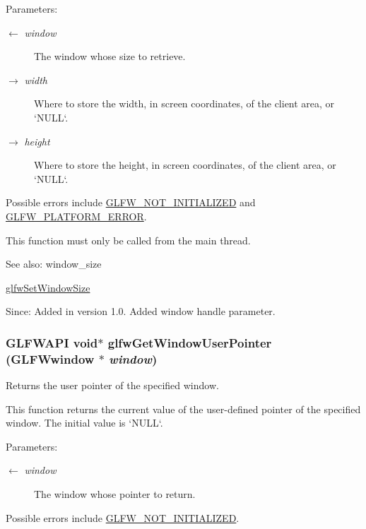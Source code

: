 \begin{Desc}
\item[Parameters:]
\begin{description}
\item[\mbox{$\leftarrow$} {\em window}]The window whose size to retrieve. \item[\mbox{$\rightarrow$} {\em width}]Where to store the width, in screen coordinates, of the client area, or `NULL`. \item[\mbox{$\rightarrow$} {\em height}]Where to store the height, in screen coordinates, of the client area, or `NULL`.\end{description}
\end{Desc}
Possible errors include \hyperlink{group__errors_g2374ee02c177f12e1fa76ff3ed15e14a}{GLFW\_\-NOT\_\-INITIALIZED} and \hyperlink{group__errors_gd44162d78100ea5e87cdd38426b8c7a1}{GLFW\_\-PLATFORM\_\-ERROR}.

This function must only be called from the main thread.

\begin{Desc}
\item[See also:]window\_\-size 

\hyperlink{group__window_ge54d1f4915ded15e267ddd3f41496cd2}{glfwSetWindowSize}\end{Desc}
\begin{Desc}
\item[Since:]Added in version 1.0.  Added window handle parameter. \end{Desc}
\hypertarget{group__window_g0a9ff3b4bf8589e9518e8816d06a8f50}{
\subsubsection[glfwGetWindowUserPointer]{\setlength{\rightskip}{0pt plus 5cm}GLFWAPI void$\ast$ glfwGetWindowUserPointer ({\bf GLFWwindow} $\ast$ {\em window})}}
\label{group__window_g0a9ff3b4bf8589e9518e8816d06a8f50}


Returns the user pointer of the specified window. 

This function returns the current value of the user-defined pointer of the specified window. The initial value is `NULL`.

\begin{Desc}
\item[Parameters:]
\begin{description}
\item[\mbox{$\leftarrow$} {\em window}]The window whose pointer to return.\end{description}
\end{Desc}
Possible errors include \hyperlink{group__errors_g2374ee02c177f12e1fa76ff3ed15e14a}{GLFW\_\-NOT\_\-INITIALIZED}.

